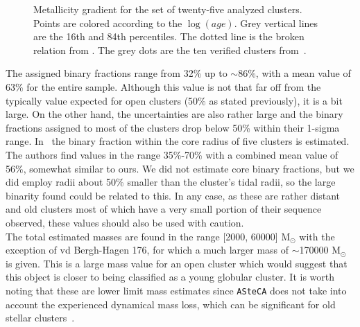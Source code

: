 \documentclass[draft]{aa}
\begin{document}
  \begin{figure}
   \caption{Metallicity gradient for the set of twenty-five analyzed clusters.
   Points are colored according to the $\log(age)$. Grey vertical lines are the
   16th and 84th percentiles. The dotted line is the broken relation from 
   \citet[][Fig 7]{Donor_2020}. The grey dots are the ten verified clusters
   from~\cite{Perren_2020}.}
   \label{fig:met_gradient}
  \end{figure}

  The assigned binary fractions range from 32\% up to $\sim86$\%, 
  with a mean value of 63\% for the entire sample. Although this value
  is not that far off from the typically value expected for open clusters (50\%
  as stated previously), it is a bit large. On the other hand, the
  uncertainties are also rather large and the binary fractions assigned to
  most of the clusters drop below 50\% within their 1-sigma range.
  In~\cite{Sollima_2010} the binary fraction within the core radius of five
  clusters is estimated. The authors find values in the range 35\%-70\% with a
  combined mean value of 56\%, somewhat similar to ours. We did not estimate
  core binary fractions, but we did employ radii about 50\% smaller than the
  cluster's tidal radii, so the large binarity found could be related to this.
  In any case, as these are rather distant and old clusters most of which have
  a very small portion of their sequence observed, these values should also be
  used with caution.\\

  The total estimated masses are found in the range [2000, 60000] M$_{\odot}$
  with the exception of vd Bergh-Hagen 176, for which a much
  larger mass of $\sim$170000 M$_{\odot}$ is given. This is a large mass
  value for an open cluster which would suggest that this object is closer to
  being classified as a young globular cluster.
  It is worth noting that these are lower limit mass
  estimates since \texttt{ASteCA} does not take into account the
  experienced dynamical mass loss, which can be significant for old stellar
  clusters~\citep{Martinez_2017}.\\
\end{document}
